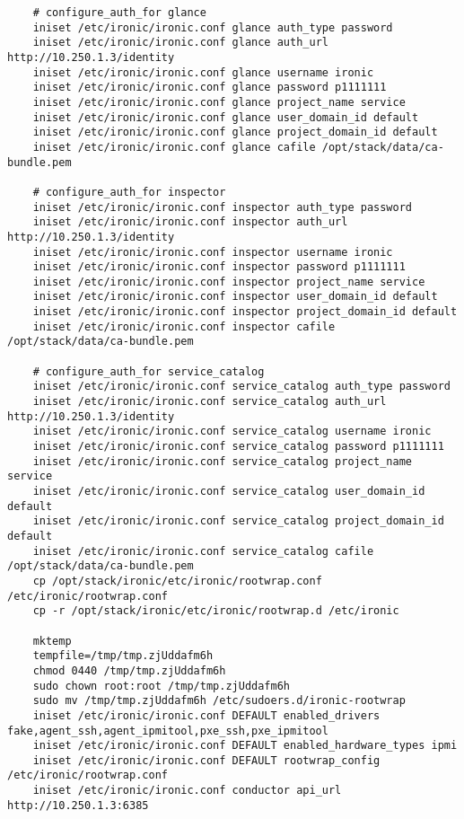 \documentclass[a4paper,left=1.5cm,right=1.5cm,11pt]{article}
\begin{document}
\begin{lstlisting}
    # configure_auth_for glance
	iniset /etc/ironic/ironic.conf glance auth_type password
    iniset /etc/ironic/ironic.conf glance auth_url http://10.250.1.3/identity
    iniset /etc/ironic/ironic.conf glance username ironic
    iniset /etc/ironic/ironic.conf glance password p1111111
    iniset /etc/ironic/ironic.conf glance project_name service
    iniset /etc/ironic/ironic.conf glance user_domain_id default
    iniset /etc/ironic/ironic.conf glance project_domain_id default
    iniset /etc/ironic/ironic.conf glance cafile /opt/stack/data/ca-bundle.pem

	# configure_auth_for inspector
	iniset /etc/ironic/ironic.conf inspector auth_type password
    iniset /etc/ironic/ironic.conf inspector auth_url http://10.250.1.3/identity
    iniset /etc/ironic/ironic.conf inspector username ironic
    iniset /etc/ironic/ironic.conf inspector password p1111111
    iniset /etc/ironic/ironic.conf inspector project_name service
    iniset /etc/ironic/ironic.conf inspector user_domain_id default
    iniset /etc/ironic/ironic.conf inspector project_domain_id default
    iniset /etc/ironic/ironic.conf inspector cafile /opt/stack/data/ca-bundle.pem

	# configure_auth_for service_catalog
	iniset /etc/ironic/ironic.conf service_catalog auth_type password
    iniset /etc/ironic/ironic.conf service_catalog auth_url http://10.250.1.3/identity
    iniset /etc/ironic/ironic.conf service_catalog username ironic
    iniset /etc/ironic/ironic.conf service_catalog password p1111111
    iniset /etc/ironic/ironic.conf service_catalog project_name service
    iniset /etc/ironic/ironic.conf service_catalog user_domain_id default
    iniset /etc/ironic/ironic.conf service_catalog project_domain_id default
    iniset /etc/ironic/ironic.conf service_catalog cafile /opt/stack/data/ca-bundle.pem
    cp /opt/stack/ironic/etc/ironic/rootwrap.conf /etc/ironic/rootwrap.conf
    cp -r /opt/stack/ironic/etc/ironic/rootwrap.d /etc/ironic

	mktemp
    tempfile=/tmp/tmp.zjUddafm6h
	chmod 0440 /tmp/tmp.zjUddafm6h
    sudo chown root:root /tmp/tmp.zjUddafm6h
    sudo mv /tmp/tmp.zjUddafm6h /etc/sudoers.d/ironic-rootwrap
    iniset /etc/ironic/ironic.conf DEFAULT enabled_drivers fake,agent_ssh,agent_ipmitool,pxe_ssh,pxe_ipmitool
    iniset /etc/ironic/ironic.conf DEFAULT enabled_hardware_types ipmi
    iniset /etc/ironic/ironic.conf DEFAULT rootwrap_config /etc/ironic/rootwrap.conf
    iniset /etc/ironic/ironic.conf conductor api_url http://10.250.1.3:6385


\end{lstlisting}
\end{document}
